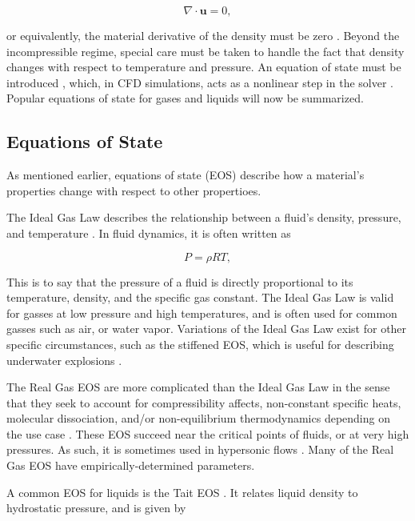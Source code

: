 \documentclass{UCF_ETD}
\begin{document}
\begin{equation}
    \nabla \cdot \textbf{u} = 0,
\end{equation}

or equivalently, the material derivative of the density must be zero \cite{johnson2016handbook}.
Beyond the incompressible regime, special care must be taken to handle the fact that density changes with respect to temperature and pressure. An equation of state must be introduced \cite{GasDynamics}, which, in CFD simulations, acts as a nonlinear step in the solver \cite{Anderson1995}. Popular equations of state for gases and liquids will now be summarized.

\subsection{Equations of State}

As mentioned earlier, equations of state (EOS) describe how a material's properties change with respect to other propertioes.

The Ideal Gas Law describes the relationship between a fluid's density, pressure, and temperature \cite{clapeyron1834}. In fluid dynamics, it is often written as

\begin{equation}
    P = \rho R T,
    \label{eq:idealGasLaw}
\end{equation}

This is to say that the pressure of a fluid is directly proportional to its temperature, density, and the specific gas constant. The Ideal Gas Law is valid for gasses at low pressure and high temperatures, and is often used for common gasses such as air, or water vapor. Variations of the Ideal Gas Law exist for other specific circumstances, such as the stiffened EOS, which is useful for describing underwater explosions \cite{stiffenedGas}.

The Real Gas EOS are more complicated than the Ideal Gas Law in the sense that they seek to account for compressibility affects, non-constant specific heats, molecular dissociation, and/or non-equilibrium thermodynamics depending on the use case \cite{vanderwaals, peng-robinson, redlich1949thermodynamics}. These EOS succeed near the critical points of fluids, or at very high pressures. As such, it is sometimes used in hypersonic flows \cite{anderson2019hypersonic}. Many of the Real Gas EOS have empirically-determined parameters. 

A common EOS for liquids is the Tait EOS \cite{tait1888physics}. It relates liquid density to hydrostatic pressure, and is given by
\end{document}
